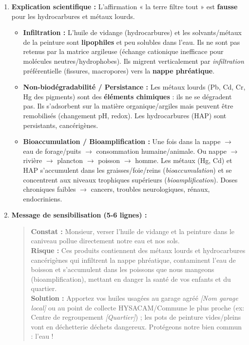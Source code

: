 \documentclass[11pt]{article}
\begin{document}
\begin{corrige}
\begin{enumerate}
    \item \textbf{Explication scientifique :}
    L'affirmation « la terre filtre tout » est \textbf{fausse} pour les hydrocarbures et métaux lourds.
    \begin{itemize}
        \item \textbf{Infiltration :} L'huile de vidange (hydrocarbures) et les solvants/métaux de la peinture sont \textbf{lipophiles} et peu solubles dans l'eau. Ils ne sont pas retenus par la matrice argileuse (échange cationique inefficace pour molécules neutres/hydrophobes). Ils migrent verticalement par \emph{infiltration} préférentielle (fissures, macropores) vers la \textbf{nappe phréatique}.
        \item \textbf{Non-biodégradabilité / Persistance :} Les métaux lourds (Pb, Cd, Cr, Hg des pigments) sont des \textbf{éléments chimiques} : ils ne se dégradent pas. Ils s'adsorbent sur la matière organique/argiles mais peuvent être remobilisés (changement pH, redox). Les hydrocarbures (HAP) sont persistants, cancérigènes.
        \item \textbf{Bioaccumulation / Bioamplification :} Une fois dans la nappe $\rightarrow$ eau de forage/puits $\rightarrow$ consommation humaine/animale. Ou nappe $\rightarrow$ rivière $\rightarrow$ plancton $\rightarrow$ poisson $\rightarrow$ homme. Les métaux (Hg, Cd) et HAP s'accumulent dans les graisses/foie/reins (\emph{bioaccumulation}) et se concentrent aux niveaux trophiques supérieurs (\emph{bioamplification}). Doses chroniques faibles $\rightarrow$ cancers, troubles neurologiques, rénaux, endocriniens.
    \end{itemize}

    \item \textbf{Message de sensibilisation (5-6 lignes) :}
    \begin{quote}
    \textbf{Constat :} Monsieur, verser l'huile de vidange et la peinture dans le caniveau pollue directement notre eau et nos sols. \\
    \textbf{Risque :} Ces produits contiennent des métaux lourds et hydrocarbures cancérigènes qui infiltrent la nappe phréatique, contaminent l'eau de boisson et s'accumulent dans les poissons que nous mangeons (bioamplification), mettant en danger la santé de vos enfants et du quartier. \\
    \textbf{Solution :} Apportez vos huiles usagées au garage agréé \textit{[Nom garage local]} ou au point de collecte HYSACAM/Commune le plus proche (ex: Centre de regroupement \textit{[Quartier]}) ; les pots de peinture vides/pleins vont en déchetterie déchets dangereux. Protégeons notre bien commun : l'eau !
    \end{quote}
\end{enumerate}
\end{corrige}
\end{document}
